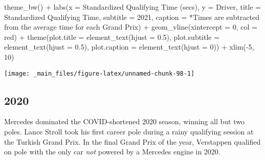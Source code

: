 \documentclass[
]{book}
\newenvironment{Shaded}{\begin{snugshade}}{\end{snugshade}}
\newcommand{\AttributeTok}[1]{\textcolor[rgb]{0.77,0.63,0.00}{#1}}
\newcommand{\DecValTok}[1]{\textcolor[rgb]{0.00,0.00,0.81}{#1}}
\newcommand{\FloatTok}[1]{\textcolor[rgb]{0.00,0.00,0.81}{#1}}
\newcommand{\FunctionTok}[1]{\textcolor[rgb]{0.00,0.00,0.00}{#1}}
\newcommand{\NormalTok}[1]{#1}
\newcommand{\SpecialCharTok}[1]{\textcolor[rgb]{0.00,0.00,0.00}{#1}}
\newcommand{\StringTok}[1]{\textcolor[rgb]{0.31,0.60,0.02}{#1}}
\begin{document}
\begin{Shaded}
\begin{Highlighting}[]
  \FunctionTok{theme\_bw}\NormalTok{() }\SpecialCharTok{+}
  \FunctionTok{labs}\NormalTok{(}\AttributeTok{x =} \StringTok{\textquotesingle{}Standardized Qualifying Time (secs)\textquotesingle{}}\NormalTok{,}
       \AttributeTok{y =} \StringTok{\textquotesingle{}Driver\textquotesingle{}}\NormalTok{,}
       \AttributeTok{title =} \StringTok{\textquotesingle{}Standardized Qualifying Time\textquotesingle{}}\NormalTok{,}
       \AttributeTok{subtitle =} \StringTok{\textquotesingle{}2021\textquotesingle{}}\NormalTok{,}
       \AttributeTok{caption =} \StringTok{\textquotesingle{}*Times are subtracted from the average time for each Grand Prix\textquotesingle{}}\NormalTok{) }\SpecialCharTok{+}
  \FunctionTok{geom\_vline}\NormalTok{(}\AttributeTok{xintercept =} \DecValTok{0}\NormalTok{, }\AttributeTok{col =} \StringTok{\textquotesingle{}red\textquotesingle{}}\NormalTok{) }\SpecialCharTok{+}
  \FunctionTok{theme}\NormalTok{(}\AttributeTok{plot.title =} \FunctionTok{element\_text}\NormalTok{(}\AttributeTok{hjust =} \FloatTok{0.5}\NormalTok{),}
        \AttributeTok{plot.subtitle =} \FunctionTok{element\_text}\NormalTok{(}\AttributeTok{hjust =} \FloatTok{0.5}\NormalTok{),}
        \AttributeTok{plot.caption =} \FunctionTok{element\_text}\NormalTok{(}\AttributeTok{hjust =} \DecValTok{0}\NormalTok{)) }\SpecialCharTok{+}
  \FunctionTok{xlim}\NormalTok{(}\SpecialCharTok{{-}}\DecValTok{5}\NormalTok{, }\DecValTok{10}\NormalTok{)}
\end{Highlighting}
\end{Shaded}

\begin{center}\texttt{[image: \_main\_files/figure-latex/unnamed-chunk-98-1]} \end{center}

\hypertarget{section-3}{%
\subsection{2020}\label{section-3}}

Mercedes dominated the COVID-shortened 2020 season, winning all but two poles. Lance Stroll took his first career pole during a rainy qualifying session at the Turkish Grand Prix. In the final Grand Prix of the year, Verstappen qualified on pole with the only car \emph{not} powered by a Mercedes engine in 2020.
\end{document}
